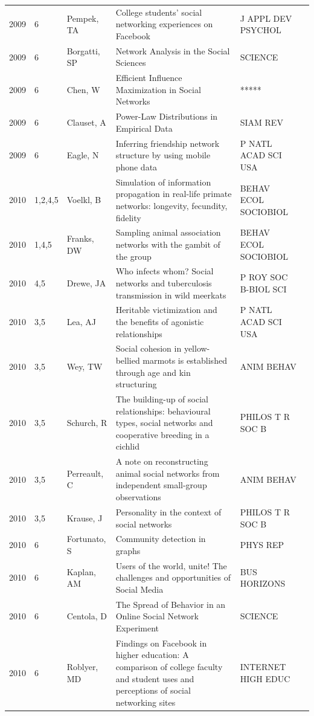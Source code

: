 \documentclass[11pt]{article} %
\begin{document}
\begin{longtable}{p{0.8cm}|p{1.25cm}|p{2.8cm}|p{7.5cm}|p{3cm}l}
2009&	6&	Pempek, TA&	 College students' social networking experiences on Facebook&         	J APPL DEV PSYCHOL\\
2009&	6&	Borgatti, SP&	 Network Analysis in the Social Sciences&         	SCIENCE\\
2009&	6&	Chen, W&	 Efficient Influence Maximization in Social Networks&         	*****\\
2009&	6&	Clauset, A&	 Power-Law Distributions in Empirical Data&         	SIAM REV\\
2009&	6&	Eagle, N&	 Inferring friendship network structure by using mobile phone data&         	P NATL ACAD SCI USA\\
2010&	1,2,4,5&	Voelkl, B&	 Simulation of information propagation in real-life primate networks: longevity, fecundity, fidelity&         	BEHAV ECOL SOCIOBIOL\\
2010&	1,4,5&	Franks, DW&	 Sampling animal association networks with the gambit of the group&         	BEHAV ECOL SOCIOBIOL\\
2010&	4,5&	Drewe, JA&	 Who infects whom? Social networks and tuberculosis transmission in wild meerkats&         	P ROY SOC B-BIOL SCI\\
2010&	3,5&	Lea, AJ&	 Heritable victimization and the benefits of agonistic relationships&         	P NATL ACAD SCI USA\\
2010&	3,5&	Wey, TW&	 Social cohesion in yellow-bellied marmots is established through age and kin structuring&         	ANIM BEHAV\\
2010&	3,5&	Schurch, R&	 The building-up of social relationships: behavioural types, social networks and cooperative breeding in a cichlid&         	PHILOS T R SOC B\\
2010&	3,5&	Perreault, C&	 A note on reconstructing animal social networks from independent small-group observations&         	ANIM BEHAV\\
2010&	3,5&	Krause, J&	 Personality in the context of social networks&         	PHILOS T R SOC B\\
2010&	6&	Fortunato, S&	 Community detection in graphs&         	PHYS REP\\
2010&	6&	Kaplan, AM&	 Users of the world, unite! The challenges and opportunities of Social Media&         	BUS HORIZONS\\
2010&	6&	Centola, D&	 The Spread of Behavior in an Online Social Network Experiment&         	SCIENCE\\
2010&	6&	Roblyer, MD&	 Findings on Facebook in higher education: A comparison of college faculty and student uses and perceptions of social networking sites&         	INTERNET HIGH EDUC\\

\end{longtable}
\end{document}
